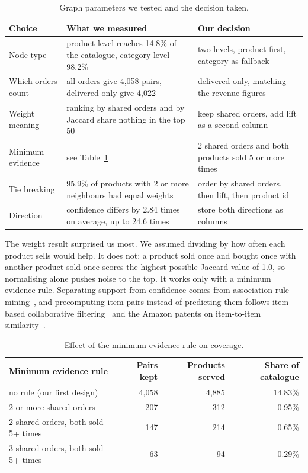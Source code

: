 \documentclass[11pt,a4paper]{article}
\begin{document}
\begin{table}[h]
\centering\footnotesize
\begin{tabular}{@{}p{2.6cm}p{6.4cm}p{6.2cm}@{}}
\toprule
\textbf{Choice} & \textbf{What we measured} & \textbf{Our decision} \\
\midrule
Node type & product level reaches 14.8\% of the catalogue, category level 98.2\% & two levels, product first, category as fallback \\
Which orders count & all orders give 4{,}058 pairs, delivered only give 4{,}022 & delivered only, matching the revenue figures \\
Weight meaning & ranking by shared orders and by Jaccard share nothing in the top 50 & keep shared orders, add lift as a second column \\
Minimum evidence & see Table~\ref{tab:evidence} & 2 shared orders and both products sold 5 or more times \\
Tie breaking & 95.9\% of products with 2 or more neighbours had equal weights & order by shared orders, then lift, then product id \\
Direction & confidence differs by 2.84 times on average, up to 24.6 times & store both directions as columns \\
\bottomrule
\end{tabular}
\caption{Graph parameters we tested and the decision taken.}
\end{table}

The weight result surprised us most. We assumed dividing by how often each product sells would
help. It does not: a product sold once and bought once with another product sold once scores the
highest possible Jaccard value of 1.0, so normalising alone pushes noise to the top. It works
only with a minimum evidence rule. Separating support from confidence comes from association
rule mining~\cite{agrawal}, and precomputing item pairs instead of predicting them follows
item-based collaborative filtering~\cite{linden,sarwar} and the Amazon patents on item-to-item
similarity~\cite{patent1,patent2}.

\begin{table}[h]
\centering\small
\begin{tabular}{@{}lrrr@{}}
\toprule
\textbf{Minimum evidence rule} & \textbf{Pairs kept} & \textbf{Products served} & \textbf{Share of catalogue} \\
\midrule
no rule (our first design) & 4{,}058 & 4{,}885 & 14.83\% \\
2 or more shared orders & 207 & 312 & 0.95\% \\
2 shared orders, both sold 5+ times & 147 & 214 & 0.65\% \\
3 shared orders, both sold 5+ times & 63 & 94 & 0.29\% \\
\bottomrule
\end{tabular}
\caption{Effect of the minimum evidence rule on coverage.}
\label{tab:evidence}
\end{table}
\end{document}
